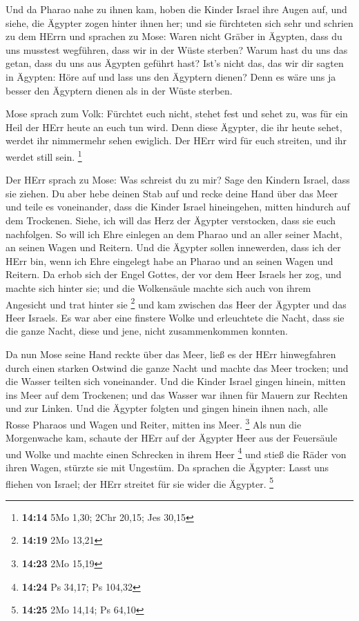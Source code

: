  Und da Pharao nahe zu ihnen kam, hoben die Kinder Israel
ihre Augen auf, und siehe, die Ägypter zogen hinter ihnen her; und sie
fürchteten sich sehr und schrien zu dem HErrn  und sprachen
zu Mose: Waren nicht Gräber in Ägypten, dass du uns musstest wegführen,
dass wir in der Wüste sterben? Warum hast du uns das getan, dass du uns
aus Ägypten geführt hast?  Ist's nicht das, das wir dir
sagten in Ägypten: Höre auf und lass uns den Ägyptern dienen? Denn es
wäre uns ja besser den Ägyptern dienen als in der Wüste sterben.

 Mose sprach zum Volk: Fürchtet euch nicht, stehet fest und
sehet zu, was für ein Heil der HErr heute an euch tun wird. Denn diese
Ägypter, die ihr heute sehet, werdet ihr nimmermehr sehen ewiglich.
 Der HErr wird für euch streiten, und ihr werdet still
sein. \footnote{\textbf{14:14} 5Mo 1,30; 2Chr 20,15; Jes 30,15}

 Der HErr sprach zu Mose: Was schreist du zu mir? Sage den
Kindern Israel, dass sie ziehen.  Du aber hebe deinen Stab
auf und recke deine Hand über das Meer und teile es voneinander, dass
die Kinder Israel hineingehen, mitten hindurch auf dem Trockenen.
 Siehe, ich will das Herz der Ägypter verstocken, dass sie
euch nachfolgen. So will ich Ehre einlegen an dem Pharao und an aller
seiner Macht, an seinen Wagen und Reitern.  Und die Ägypter
sollen innewerden, dass ich der HErr bin, wenn ich Ehre eingelegt habe
an Pharao und an seinen Wagen und Reitern.  Da erhob sich
der Engel Gottes, der vor dem Heer Israels her zog, und machte sich
hinter sie; und die Wolkensäule machte sich auch von ihrem Angesicht und
trat hinter sie \footnote{\textbf{14:19} 2Mo 13,21}  und
kam zwischen das Heer der Ägypter und das Heer Israels. Es war aber eine
finstere Wolke und erleuchtete die Nacht, dass sie die ganze Nacht,
diese und jene, nicht zusammenkommen konnten.

 Da nun Mose seine Hand reckte über das Meer, ließ es der
HErr hinwegfahren durch einen starken Ostwind die ganze Nacht und machte
das Meer trocken; und die Wasser teilten sich voneinander. 
Und die Kinder Israel gingen hinein, mitten ins Meer auf dem Trockenen;
und das Wasser war ihnen für Mauern zur Rechten und zur Linken.
 Und die Ägypter folgten und gingen hinein ihnen nach, alle
Rosse Pharaos und Wagen und Reiter, mitten ins Meer. \footnote{\textbf{14:23}
  2Mo 15,19}  Als nun die Morgenwache kam, schaute der HErr
auf der Ägypter Heer aus der Feuersäule und Wolke und machte einen
Schrecken in ihrem Heer \footnote{\textbf{14:24} Ps 34,17; Ps 104,32}
 und stieß die Räder von ihren Wagen, stürzte sie mit
Ungestüm. Da sprachen die Ägypter: Lasst uns fliehen von Israel; der
HErr streitet für sie wider die Ägypter. \footnote{\textbf{14:25} 2Mo
  14,14; Ps 64,10}

